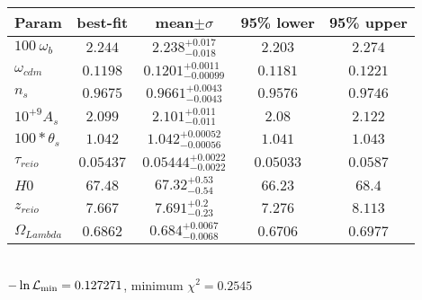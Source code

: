 \begin{tabular}{|l|c|c|c|c|} 
 \hline 
Param & best-fit & mean$\pm\sigma$ & 95\% lower & 95\% upper \\ \hline 
$100~\omega{}_{b }$ &$2.244$ & $2.238_{-0.018}^{+0.017}$ & $2.203$ & $2.274$ \\ 
$\omega{}_{cdm }$ &$0.1198$ & $0.1201_{-0.00099}^{+0.0011}$ & $0.1181$ & $0.1221$ \\ 
$n_{s }$ &$0.9675$ & $0.9661_{-0.0043}^{+0.0043}$ & $0.9576$ & $0.9746$ \\ 
$10^{+9}A_{s }$ &$2.099$ & $2.101_{-0.011}^{+0.011}$ & $2.08$ & $2.122$ \\ 
$100*\theta{}_{s }$ &$1.042$ & $1.042_{-0.00056}^{+0.00052}$ & $1.041$ & $1.043$ \\ 
$\tau{}_{reio }$ &$0.05437$ & $0.05444_{-0.0022}^{+0.0022}$ & $0.05033$ & $0.0587$ \\ 
$H0$ &$67.48$ & $67.32_{-0.54}^{+0.53}$ & $66.23$ & $68.4$ \\ 
$z_{reio }$ &$7.667$ & $7.691_{-0.23}^{+0.2}$ & $7.276$ & $8.113$ \\ 
$\Omega{}_{Lambda }$ &$0.6862$ & $0.684_{-0.0068}^{+0.0067}$ & $0.6706$ & $0.6977$ \\ 
\hline 
 \end{tabular} \\ 
$-\ln{\cal L}_\mathrm{min} =0.127271$, minimum $\chi^2=0.2545$ \\ 
